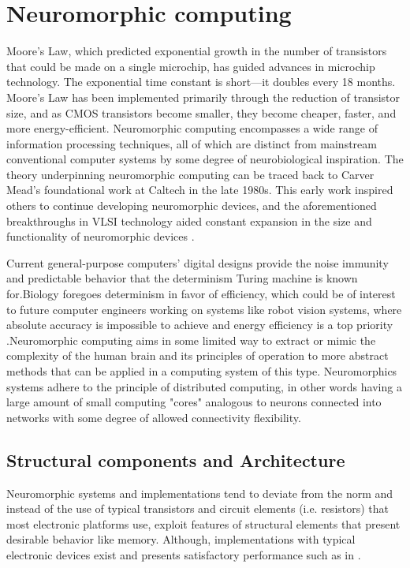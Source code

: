 \documentclass[12pt]{report}
\begin{document}
\chapter{Neuromorphic computing}

Moore's Law, which predicted exponential growth in the number of transistors that could be made on a single microchip, has guided advances in microchip technology. The exponential time constant is short—it doubles every 18 months. Moore's Law has been implemented primarily through the reduction of transistor size, and as CMOS transistors become smaller, they become cheaper, faster, and more energy-efficient.
Neuromorphic computing encompasses a wide range of information processing techniques, all of which are distinct from mainstream conventional computer systems by some degree of neurobiological inspiration. The theory underpinning neuromorphic computing can be traced back to Carver Mead's foundational work at Caltech in the late 1980s. This early work inspired others to continue developing neuromorphic devices, and the aforementioned breakthroughs in VLSI technology aided constant expansion in the size and functionality of neuromorphic devices \cite{furber2016}.

Current general-purpose computers' digital designs provide the noise immunity and predictable behavior that the determinism Turing machine is known for.Biology foregoes determinism in favor of efficiency, which could be of interest to future computer engineers working on systems like robot vision systems, where absolute accuracy is impossible to achieve and energy efficiency is a top priority .Neuromorphic computing aims in some limited way to extract or mimic  the complexity of the human brain and its principles of operation to more abstract methods that can be applied in a computing system of this type. Neuromorphics systems adhere to the principle of distributed computing, in other words having a large amount of small computing "cores" analogous to neurons connected into networks with some degree of allowed connectivity flexibility. 

\section{Structural components and Architecture}

Neuromorphic systems and implementations tend to deviate from the norm and instead of the use of typical transistors and circuit elements (i.e. resistors) that most electronic platforms use, exploit features of structural elements that present desirable behavior like memory. Although, implementations with typical electronic devices exist and presents satisfactory performance such as in \cite{Clayton2011}. 
\end{document}

